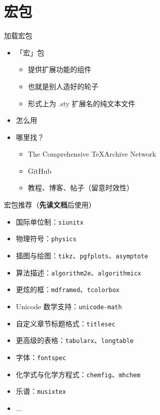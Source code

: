 \section{宏包}

\begin{frame}{加载宏包}
\begin{itemize}
  \item<+-> 「宏」包

    \begin{itemize}
      \item 提供扩展功能的组件
      \item 也就是别人造好的轮子
      \item 形式上为 .sty 扩展名的纯文本文件
    \end{itemize}

  \item<+-> 怎么用


  \item<+-> 哪里找？

    \begin{itemize}
      \item The Comprehensive \TeX Archive Network 
      \item GitHub
      \item<+-> 教程、博客、帖子（\alert{留意时效性}）
    \end{itemize}
\end{itemize}
\end{frame}

\begin{frame}{宏包推荐（\textbf{先读文档}后使用）}
  \begin{itemize}
      \item 国际单位制：\texttt{siunitx}
      \item 物理符号：\texttt{physics}
      \item 插图与绘图：\texttt{tikz}、\texttt{pgfplots}、\texttt{asymptote}
      \item 算法描述：\texttt{algorithm2e}、\texttt{algorithmicx}
      \item 更炫的框：\texttt{mdframed}、\texttt{tcolorbox}
      \item Unicode 数学支持：\texttt{unicode-math}
      \item 自定义章节标题格式：\texttt{titlesec}
      \item 更高级的表格：\texttt{tabularx}、\texttt{longtable}
      \item 字体：\texttt{fontspec}
      \item 化学式与化学方程式：\texttt{chemfig}、\texttt{mhchem}
      \item 乐谱：\texttt{musixtex}
      \item ...
  \end{itemize}
\end{frame}